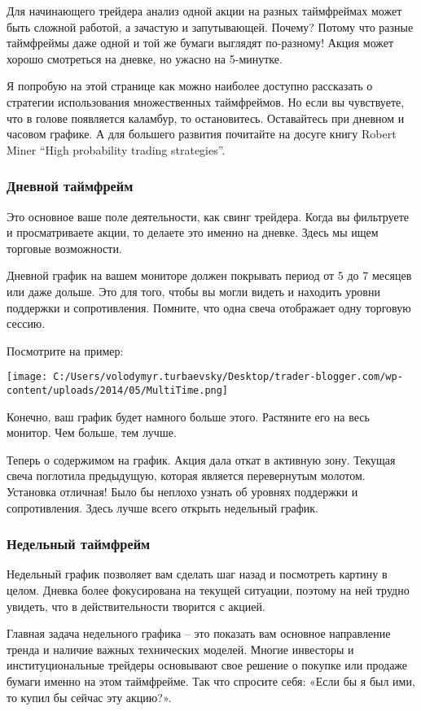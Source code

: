 \documentclass[a5paper]{article}
\begin{document}
Для начинающего трейдера анализ одной акции на разных таймфреймах может быть сложной работой, а зачастую и запутывающей. Почему? Потому что разные таймфреймы даже одной и той же бумаги выглядят по-разному! Акция может хорошо смотреться на дневке, но ужасно на 5-минутке.

Я попробую на этой странице как можно наиболее доступно рассказать о
стратегии использования множественных таймфреймов. Но если вы
чувствуете, что в голове появляется каламбур, то
остановитесь. Оставайтесь при дневном и часовом графике. А для
большего развития почитайте на досуге книгу Robert Miner “High
probability trading strategies”.

\subsubsection{Дневной таймфрейм}

Это основное ваше поле деятельности, как свинг трейдера. Когда вы фильтруете и просматриваете акции, то делаете это именно на дневке. Здесь мы ищем торговые возможности.

Дневной график на вашем мониторе должен покрывать период от 5 до 7 месяцев или даже дольше. Это для того, чтобы вы могли видеть и находить уровни поддержки и сопротивления. Помните, что одна свеча отображает одну торговую сессию.

Посмотрите на пример:

\texttt{[image: C:/Users/volodymyr.turbaevsky/Desktop/trader-blogger.com/wp-content/uploads/2014/05/MultiTime.png]}

Конечно, ваш график будет намного больше этого. Растяните его на весь монитор. Чем больше, тем лучше.

Теперь о содержимом на график. Акция дала откат в активную
зону. Текущая свеча поглотила предыдущую, которая является
перевернутым молотом. Установка отличная! Было бы неплохо узнать об
уровнях поддержки и сопротивления. Здесь лучше всего открыть недельный
график.

\subsubsection{Недельный таймфрейм}

Недельный график позволяет вам сделать шаг назад и посмотреть картину в целом. Дневка более фокусирована на текущей ситуации, поэтому на ней трудно увидеть, что в действительности творится с акцией.

Главная задача недельного графика – это показать вам основное направление тренда и наличие важных технических моделей. Многие инвесторы и институциональные трейдеры основывают свое решение о покупке или продаже бумаги именно на этом таймфрейме. Так что спросите себя: «Если бы я был ими, то купил бы сейчас эту акцию?».
\end{document}
